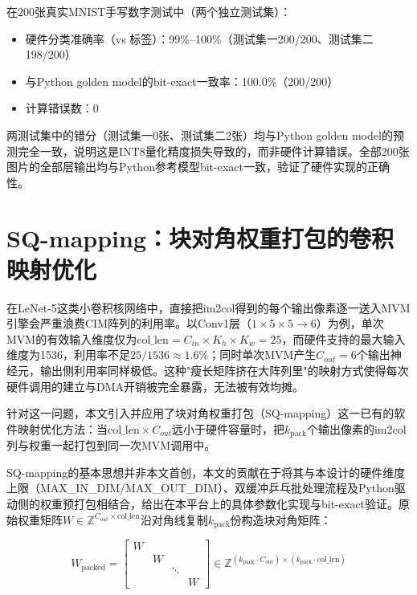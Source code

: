 \documentclass[bachelor,compact,nofont]{xjtuthesis}
\numberwithin{equation}{chapter}
\begin{document}
在200张真实MNIST手写数字测试中（两个独立测试集）：
\begin{itemize}
	\item 硬件分类准确率（vs 标签）：99\%--100\%（测试集一200/200、测试集二198/200）
	\item 与Python golden model的bit-exact一致率：100.0\%（200/200）
	\item 计算错误数：0
\end{itemize}

两测试集中的错分（测试集一0张、测试集二2张）均与Python golden model的预测完全一致，说明这是INT8量化精度损失导致的，而非硬件计算错误。全部200张图片的全部层输出均与Python参考模型bit-exact一致，验证了硬件实现的正确性。


\section{SQ-mapping：块对角权重打包的卷积映射优化}
\label{sec:sqmapping}

在LeNet-5这类小卷积核网络中，直接把im2col得到的每个输出像素逐一送入MVM引擎会严重浪费CIM阵列的利用率。以Conv1层（$1\times5\times5\to6$）为例，单次MVM的有效输入维度仅为$\text{col\_len} = C_{in}\times K_h\times K_w = 25$，而硬件支持的最大输入维度为1536，利用率不足$25/1536\approx 1.6\%$；同时单次MVM产生$C_{out}=6$个输出神经元，输出侧利用率同样极低。这种"瘦长矩阵挤在大阵列里"的映射方式使得每次硬件调用的建立与DMA开销被完全暴露，无法被有效均摊。

针对这一问题，本文引入并应用了块对角权重打包（SQ-mapping）这一已有的软件映射优化方法：当$\text{col\_len}\times C_{out}$远小于硬件容量时，把$k_{\text{pack}}$个输出像素的im2col列与权重一起打包到同一次MVM调用中。

SQ-mapping的基本思想并非本文首创，本文的贡献在于将其与本设计的硬件维度上限（MAX\_IN\_DIM/MAX\_OUT\_DIM）、双缓冲乒乓批处理流程及Python驱动侧的权重预打包相结合，给出在本平台上的具体参数化实现与bit-exact验证。原始权重矩阵$W\in\mathbb{Z}^{C_{out}\times \text{col\_len}}$沿对角线复制$k_{\text{pack}}$份构造块对角矩阵：

\begin{equation}
	W_{\text{packed}} = \begin{bmatrix}
		W & & & \\
		& W & & \\
		& & \ddots & \\
		& & & W
	\end{bmatrix} \in \mathbb{Z}^{(k_{\text{pack}}\cdot C_{out})\times (k_{\text{pack}}\cdot \text{col\_len})}
\end{equation}
\end{document}
